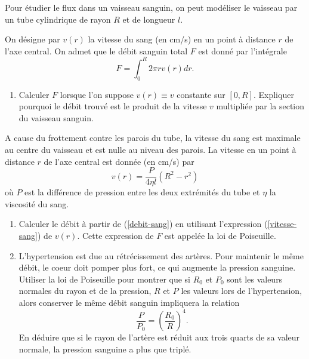 \begin{exo}
    Pour étudier le flux dans un vaisseau sanguin, on peut modéliser le vaisseau par un tube cylindrique de rayon $R$ et de longueur $l$.

    On désigne par $v(r)$ la vitesse du sang (en cm/s) en un point à distance $r$ de l'axe central. On admet que le débit sanguin total $F$ est donné par l'intégrale
        \begin{equation}
          F = \int_0^R 2 \pi r v(r) dr. \label{debit-sang}
        \end{equation}

    \begin{enumerate}
        \item Calculer $F$ lorsque l'on suppose $v(r) \equiv v$ constante sur $[0,R]$. Expliquer pourquoi le débit trouvé est le produit de la vitesse $v$ multipliée par la section du vaisseau sanguin.
    \end{enumerate}

    A cause du frottement contre les parois du tube, la vitesse du sang est maximale au centre du vaisseau et est nulle au niveau des parois. La vitesse en un point à distance $r$ de l'axe central est donnée (en {cm/s}) par
    \begin{equation}
        v(r)=\frac {P} {4 \eta l} (R^2-r^2) \label{vitesse-sang}
    \end{equation}
    où $P$ est la différence de pression entre les deux extrémités du tube et $\eta$ la viscosité du sang.

    \setcounter{enumi}{1}
    \begin{enumerate}
        \item Calculer le débit à partir de (\ref{debit-sang}) en utilisant l'expression (\ref{vitesse-sang}) de $v(r)$. Cette expression de $F$ est appelée la loi de Poiseuille.
        \item L'hypertension est due au rétrécissement des artères. Pour maintenir le même débit, le coeur doit pomper plus fort, ce qui augmente la pression sanguine. Utiliser la loi de Poiseuille pour montrer que si $R_0$ et $P_0$ sont les valeurs normales du rayon et de la pression, $R$ et $P$ les valeurs lors de l'hypertension, alors conserver le même débit sanguin impliquera la relation
        \begin{equation}
            \frac P {P_0} = (\frac {R_0} R) ^4.
        \end{equation}
        En déduire que si le rayon de l'artère est réduit aux trois quarts de sa valeur normale, la pression sanguine a plus que triplé.
    \end{enumerate}
\end{exo}


